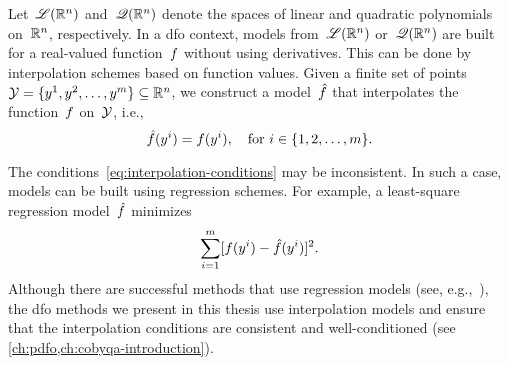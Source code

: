 Let~$\mathscr{L}(\mathbb{R}^n)$ and~$\mathscr{Q}(\mathbb{R}^n)$ denote the spaces of linear and quadratic polynomials on~$\mathbb{R}^n$, respectively.
In a \gls{dfo} context, models from~$\mathscr{L}(\mathbb{R}^n)$ or~$\mathscr{Q}(\mathbb{R}^n)$ are built for a real-valued function~$f$ without using derivatives.
This can be done by interpolation schemes based on function values.
Given a finite set of points~$\xpt = \set{y^1, y^2, \dots, y^m} \subseteq \R^n$, we construct a model~$\objm$ that interpolates the function~$f$ on~$\xpt$, i.e.,
\begin{equation}
    \label{eq:interpolation-conditions}
    \objm(y^i) = \obj(y^i), \quad \text{for~$i \in \set{1, 2, \dots, m}$}.
\end{equation}

The conditions~\cref{eq:interpolation-conditions} may be inconsistent.
In such a case, models can be built using regression schemes.
For example, a least-square regression model~$\objm$ minimizes
\begin{equation*}
    \sum_{i = 1}^m [\obj(y^i) - \objm(y^i)]^2.
\end{equation*}
Although there are successful methods that use regression models (see, e.g.,~\cite{Billups_Larson_Graf_2013,Conn_Scheinberg_Vicente_2008b}), the \gls{dfo} methods we present in this thesis use interpolation models and ensure that the interpolation conditions are consistent and well-conditioned (see \cref{ch:pdfo,ch:cobyqa-introduction}).


